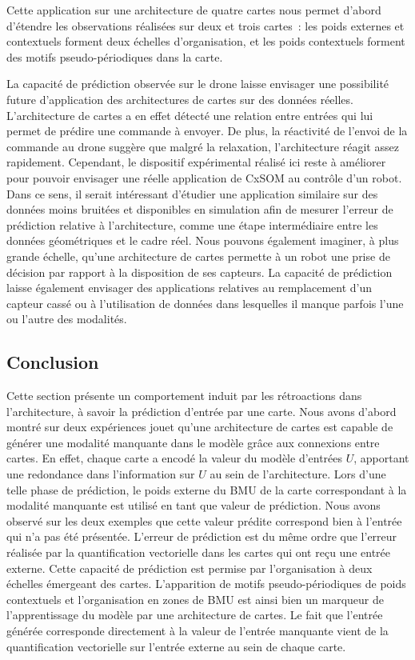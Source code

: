 \documentclass[../main]{subfiles}
\begin{document}
Cette application sur une architecture de quatre cartes nous permet d'abord d'étendre les observations réalisées sur deux et trois cartes~: les poids externes et contextuels forment deux échelles d'organisation, et les poids contextuels forment des motifs pseudo-périodiques dans la carte.


La capacité de prédiction observée sur le drone laisse envisager une possibilité future d'application des architectures de cartes sur des données réelles. 
L'architecture de cartes a en effet détecté une relation entre entrées qui lui permet de prédire une commande à envoyer. De plus, la réactivité de l'envoi de la commande au drone suggère que malgré la relaxation, l'architecture réagit assez rapidement. Cependant, le dispositif expérimental réalisé ici reste à améliorer pour pouvoir envisager une réelle application de CxSOM au contrôle d'un robot. Dans ce sens, il serait intéressant d'étudier une application similaire sur des données moins bruitées et disponibles en simulation afin de mesurer l'erreur de prédiction relative à l'architecture, comme une étape intermédiaire entre les données géométriques et le cadre réel. 
Nous pouvons également imaginer, à plus grande échelle, qu'une architecture de cartes permette à un robot une prise de décision par rapport à la disposition de ses capteurs. La capacité de prédiction laisse également envisager des applications relatives au remplacement d'un capteur cassé ou à l'utilisation de données dans lesquelles il manque parfois l'une ou l'autre des modalités.

\subsection{Conclusion}

Cette section présente un comportement induit par les rétroactions dans l'architecture, à savoir la prédiction d'entrée par une carte.
Nous avons d'abord montré sur deux expériences jouet qu'une architecture de cartes est capable de générer une modalité manquante dans le modèle grâce aux connexions entre cartes. En effet, chaque carte a encodé la valeur du modèle d'entrées $U$, apportant une redondance dans l'information sur $U$ au sein de l'architecture. 
Lors d'une telle phase de prédiction, le poids externe du BMU de la carte correspondant à la modalité manquante est utilisé en tant que valeur de prédiction.
Nous avons observé sur les deux exemples que cette valeur prédite correspond bien à l'entrée qui n'a pas été présentée. L'erreur de prédiction est du même ordre que l'erreur réalisée par la quantification vectorielle dans les cartes qui ont reçu une entrée externe.
Cette capacité de prédiction est permise par l'organisation à deux échelles émergeant des cartes. L'apparition de motifs pseudo-périodiques de poids contextuels et l'organisation en zones de BMU est ainsi bien un marqueur de l'apprentissage du modèle par une architecture de cartes. 
Le fait que l'entrée générée corresponde directement à la valeur de l'entrée manquante vient de la quantification vectorielle sur l'entrée externe au sein de chaque carte.
\end{document}
